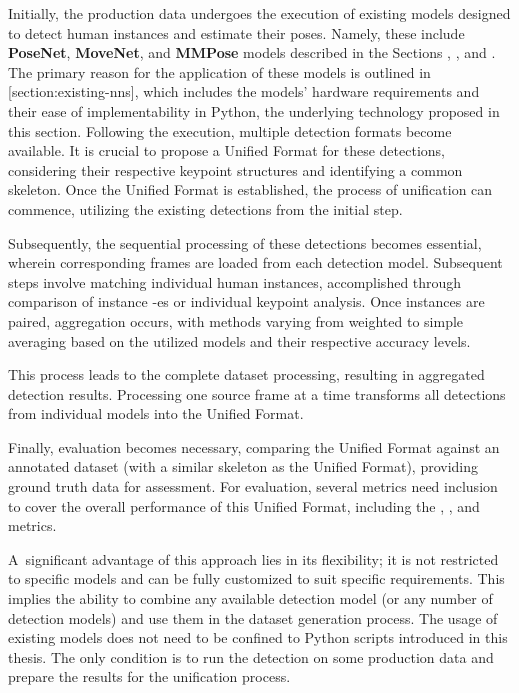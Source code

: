 Initially, the production data undergoes the execution of existing models designed to detect human instances and estimate their poses. Namely, these include {\bf PoseNet}, {\bf MoveNet}, and {\bf MMPose} models described in the Sections , , and . The primary reason for the application of these models is outlined in [section:existing-nns], which includes the models' hardware requirements and their ease of implementability in Python, the underlying technology proposed in this section. Following the execution, multiple detection formats become available. It is crucial to propose a Unified Format for these detections, considering their respective keypoint structures and identifying a common skeleton. Once the Unified Format is established, the process of unification can commence, utilizing the existing detections from the initial step.

Subsequently, the sequential processing of these detections becomes essential, wherein corresponding frames are loaded from each detection model. Subsequent steps involve matching individual human instances, accomplished through comparison of instance {\bf \BBOX}-es or individual keypoint analysis. Once instances are paired, aggregation occurs, with methods varying from weighted to simple averaging based on the utilized models and their respective accuracy levels.

This process leads to the complete dataset processing, resulting in aggregated detection results. Processing one source frame at a time transforms all detections from individual models into the Unified Format.

Finally, evaluation becomes necessary, comparing the Unified Format against an annotated dataset (with a similar skeleton as the Unified Format), providing ground truth data for assessment. For evaluation, several metrics need inclusion to cover the overall performance of this Unified Format, including the {\bf \APE}, {\bf \MSE}, and {\bf \OKS} metrics.

A~significant advantage of this approach lies in its flexibility; it is not restricted to specific models and can be fully customized to suit specific requirements. This implies the ability to combine any available detection model (or any number of detection models) and use them in the dataset generation process. The usage of existing models does not need to be confined to Python scripts introduced in this thesis. The only condition is to run the detection on some production data and prepare the results for the unification process.

